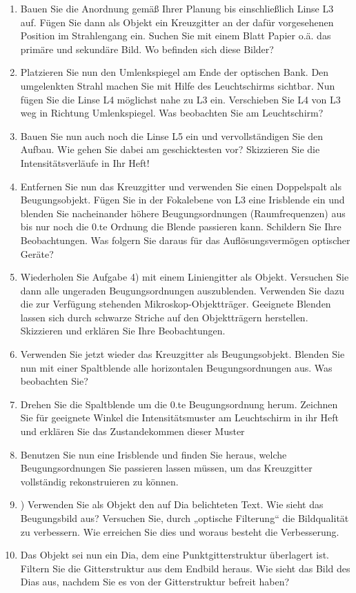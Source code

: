 \begin{enumerate}
	\item  Bauen Sie die Anordnung gemäß Ihrer Planung bis einschließlich Linse L3 auf. Fügen Sie dann
	als Objekt ein Kreuzgitter an der dafür vorgesehenen Position im Strahlengang ein. Suchen Sie
	mit einem Blatt Papier o.ä. das primäre und sekundäre Bild. Wo befinden sich diese Bilder?
	\item Platzieren Sie nun den Umlenkspiegel am Ende der optischen Bank. Den umgelenkten Strahl
	machen Sie mit Hilfe des Leuchtschirms sichtbar. Nun fügen Sie die Linse L4 möglichst nahe
	zu L3 ein. Verschieben Sie L4 von L3 weg in Richtung Umlenkspiegel. Was beobachten Sie am
	Leuchtschirm?
	\item Bauen Sie nun auch noch die Linse L5 ein und vervollständigen Sie den Aufbau. Wie gehen Sie
	dabei am geschicktesten vor? Skizzieren Sie die Intensitätsverläufe in Ihr Heft!
	\item  Entfernen Sie nun das Kreuzgitter und verwenden Sie einen Doppelspalt als Beugungsobjekt.
	Fügen Sie in der Fokalebene von L3 eine Irisblende ein und blenden Sie nacheinander höhere
	Beugungsordnungen (Raumfrequenzen) aus bis nur noch die 0.te Ordnung die Blende passieren
	kann. Schildern Sie Ihre Beobachtungen. Was folgern Sie daraus für das Auflösungsvermögen
	optischer Geräte?
	\item Wiederholen Sie Aufgabe 4) mit einem Liniengitter als Objekt. Versuchen Sie dann alle ungeraden
	Beugungsordnungen auszublenden. Verwenden Sie dazu die zur Verfügung stehenden
	Mikroskop-Objektträger. Geeignete Blenden lassen sich durch schwarze Striche auf den Objektträgern
	herstellen. Skizzieren und erklären Sie Ihre Beobachtungen.
	\item Verwenden Sie jetzt wieder das Kreuzgitter als Beugungsobjekt. Blenden Sie nun mit einer
	Spaltblende alle horizontalen Beugungsordnungen aus. Was beobachten Sie?
	\item Drehen Sie die Spaltblende um die 0.te Beugungsordnung herum. Zeichnen Sie für geeignete
	Winkel die Intensitätsmuster am Leuchtschirm in ihr Heft und erklären Sie das Zustandekommen
	dieser Muster
	\item Benutzen Sie nun eine Irisblende und finden Sie heraus, welche Beugungsordnungen Sie passieren
	lassen müssen, um das Kreuzgitter vollständig rekonstruieren zu können.
	\item ) Verwenden Sie als Objekt den auf Dia belichteten Text. Wie sieht das Beugungsbild aus?
	Versuchen Sie, durch „optische Filterung“ die Bildqualität zu verbessern. Wie erreichen Sie
	dies und woraus besteht die Verbesserung.
	\item Das Objekt sei nun ein Dia, dem eine Punktgitterstruktur überlagert ist. Filtern Sie die
	Gitterstruktur aus dem Endbild heraus. Wie sieht das Bild des Dias aus, nachdem Sie es von
	der Gitterstruktur befreit haben?
	
\end{enumerate}

